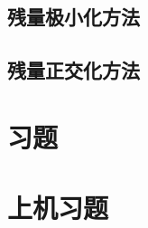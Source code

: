 \pending

\subsection{残量极小化方法}

\pending

\subsection{残量正交化方法}

\pending

\section{习题}

\pending

\section{上机习题}

\pending
